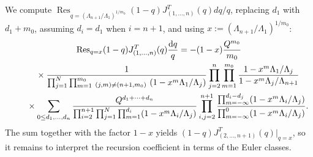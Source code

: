 \documentclass[pdftex]{sigma}
\numberwithin{equation}{section}
\def\Res{\operatorname{Res}}
\begin{document}
We compute $\Res_{q=(\Lambda_{n+1}/\Lambda_1)^{1/m_0}} (1-q)J^T_{(1,\dots,n)}(q)dq/q$, replacing $d_1$ with $d_1+m_0$, assuming $d_i=d_1$ when $i=n+1$, and using $x:= (\Lambda_{n+1}/\Lambda_1)^{1/m_0}$:
\begin{gather*}
\Res_{q=x} (1-q)J^T_{(1,\dots,n)}(q)\frac{{\rm d}q}{q} = -(1-x)\frac{Q^{m_0}}{m_0}
\\ \qquad
{}\times\frac{1}{\prod_{j=1}^N\prod_{m=1}^{m_0}\,_{(j,m)\neq (n+1,m_0)}\ (1-x^m\Lambda_1/\Lambda_j)} \prod_{j=2}^n\prod_{m=1}^{m_0}\frac{1-x^m\Lambda_1/\Lambda_j}{1-x^m\Lambda_j/\Lambda_{n+1}}
\\ \qquad
{}\times\sum_{0\leq d_1,\dots,d_n}\frac{Q^{d_1+\cdots+d_n}}{\prod_{i=2}^{n+1}\prod_{j=1}^N\prod_{m=1}^{d_i}
(1-x^m\Lambda_i/\Lambda_j)} \prod_{i,j=2}^{n+1}\frac{\prod_{m=-\infty}^{d_i-d_j}
(1-x^m\Lambda_i/\Lambda_j)}{\prod_{m=-\infty}^0(1-x^m\Lambda_i/\Lambda_j)}.
\end{gather*}
The sum together with the factor $1-x$ yields $(1-q)J^T_{(2,\dots,n+1)}(q)|_{q=x}$, so it remains to interpret the recursion coefficient in terms of the Euler classes.
\end{document}

